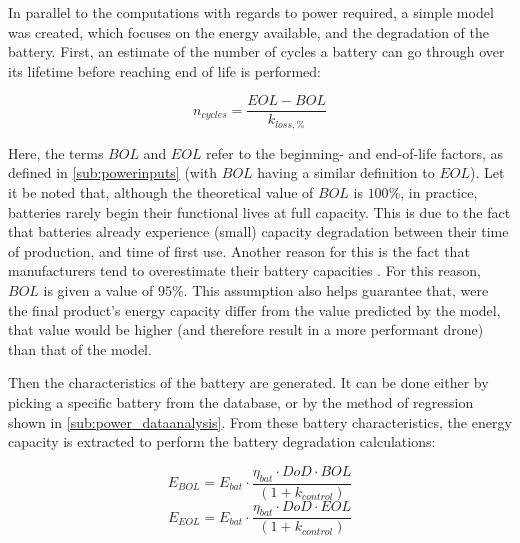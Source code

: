 In parallel to the computations with regards to power required, a simple model was created, which focuses on the energy available, and the degradation of the battery. First, an estimate of the number of cycles a battery can go through over its lifetime before reaching end of life is performed:

\begin{equation}
    n_{\mathit{cycles}} = \frac{\mathit{EOL} - \mathit{BOL}}{k_{\mathit{loss,\%}}}
\end{equation}

Here, the terms $\mathit{BOL}$ and $\mathit{EOL}$ refer to the beginning- and end-of-life factors, as defined in \ref{sub:powerinputs} (with $\mathit{BOL}$ having a similar definition to $\mathit{EOL}$). Let it be noted that, although the theoretical value of $\mathit{BOL}$ is $100\%$, in practice, batteries rarely begin their functional lives at full capacity. This is due to the fact that batteries already experience (small) capacity degradation between their time of production, and time of first use. Another reason for this is the fact that manufacturers tend to overestimate their battery capacities \cite{BU_how_to_prolong_lithium_based_batteries}. For this reason, $\mathit{BOL}$ is given a value of $95\%$. This assumption also helps guarantee that, were the final product's energy capacity differ from the value predicted by the model, that value would be higher (and therefore result in a more performant drone) than that of the model.

Then the characteristics of the battery are generated. It can be done either by picking a specific battery from the database, or by the method of regression shown in \ref{sub:power_dataanalysis}. From these battery characteristics, the energy capacity is extracted to perform the battery degradation calculations:

\begin{multicols}{2}
\noindent
    \begin{equation}
    E_{\mathit{BOL}} = E_{\mathit{bat}} \cdot \frac{\eta_{\mathit{bat}} \cdot \mathit{DoD} \cdot \mathit{BOL}}{(1 + k_{\mathit{control}})}
    \label{eq:E_BOL}
    \end{equation}
    \begin{equation}
    E_{\mathit{EOL}} = E_{\mathit{bat}} \cdot \frac{\eta_{\mathit{bat}} \cdot \mathit{DoD} \cdot \mathit{EOL}}{(1 + k_{\mathit{control}})}
    \label{eq:E_EOL}
    \end{equation}
\end{multicols}

